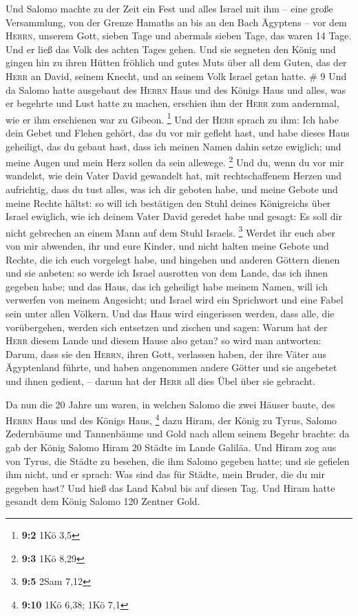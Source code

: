  Und Salomo machte zu der Zeit ein Fest und alles Israel
mit ihm -- eine große Versammlung, von der Grenze Hamaths an bis an den
Bach Ägyptens -- vor dem \textsc{Herrn}, unserem Gott, sieben Tage und
abermals sieben Tage, das waren 14 Tage.  Und er ließ das
Volk des achten Tages gehen. Und sie segneten den König und gingen hin
zu ihren Hütten fröhlich und gutes Muts über all dem Guten, das der
\textsc{Herr} an David, seinem Knecht, und an seinem Volk Israel getan
hatte. \# 9  Und da Salomo hatte ausgebaut des
\textsc{Herrn} Haus und des Königs Haus und alles, was er begehrte und
Lust hatte zu machen,  erschien ihm der \textsc{Herr} zum
andernmal, wie er ihm erschienen war zu Gibeon. \footnote{\textbf{9:2}
  1Kö 3,5}  Und der \textsc{Herr} sprach zu ihm: Ich habe
dein Gebet und Flehen gehört, das du vor mir gefleht hast, und habe
dieses Haus geheiligt, das du gebaut hast, dass ich meinen Namen dahin
setze ewiglich; und meine Augen und mein Herz sollen da sein allewege.
\footnote{\textbf{9:3} 1Kö 8,29}  Und du, wenn du vor mir
wandelst, wie dein Vater David gewandelt hat, mit rechtschaffenem Herzen
und aufrichtig, dass du tust alles, was ich dir geboten habe, und meine
Gebote und meine Rechte hältst:  so will ich bestätigen
den Stuhl deines Königreichs über Israel ewiglich, wie ich deinem Vater
David geredet habe und gesagt: Es soll dir nicht gebrechen an einem Mann
auf dem Stuhl Israels. \footnote{\textbf{9:5} 2Sam 7,12} 
Werdet ihr euch aber von mir abwenden, ihr und eure Kinder, und nicht
halten meine Gebote und Rechte, die ich euch vorgelegt habe, und
hingehen und anderen Göttern dienen und sie anbeten:  so
werde ich Israel ausrotten von dem Lande, das ich ihnen gegeben habe;
und das Haus, das ich geheiligt habe meinem Namen, will ich verwerfen
von meinem Angesicht; und Israel wird ein Sprichwort und eine Fabel sein
unter allen Völkern.  Und das Haus wird eingerissen
werden, dass alle, die vorübergehen, werden sich entsetzen und zischen
und sagen: Warum hat der \textsc{Herr} diesem Lande und diesem Hause
also getan?  so wird man antworten: Darum, dass sie den
\textsc{Herrn}, ihren Gott, verlassen haben, der ihre Väter aus
Ägyptenland führte, und haben angenommen andere Götter und sie angebetet
und ihnen gedient, -- darum hat der \textsc{Herr} all dies Übel über sie
gebracht.

 Da nun die 20 Jahre um waren, in welchen Salomo die zwei
Häuser baute, des \textsc{Herrn} Haus und des Königs Haus, \footnote{\textbf{9:10}
  1Kö 6,38; 1Kö 7,1}  dazu Hiram, der König zu Tyrus,
Salomo Zedernbäume und Tannenbäume und Gold nach allem seinem Begehr
brachte: da gab der König Salomo Hiram 20 Städte im Lande Galiläa.
 Und Hiram zog aus von Tyrus, die Städte zu besehen, die
ihm Salomo gegeben hatte; und sie gefielen ihm nicht, 
und er sprach: Was sind das für Städte, mein Bruder, die du mir gegeben
hast? Und hieß das Land Kabul bis auf diesen Tag.  Und
Hiram hatte gesandt dem König Salomo 120 Zentner Gold.

